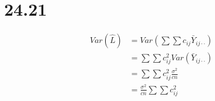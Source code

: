\documentclass{article}\usepackage[]{graphicx}\usepackage[]{color}
\begin{document}
\section{24.21}

\begin{displaymath}
\begin{split}
Var(\hat{L}) &= Var(\sum\sum c_{ij}\bar{Y}_{ij\cdot\cdot}) \\
             &= \sum\sum c_{ij}^2 Var(\bar{Y}_{ij\cdot\cdot}) \\
             &= \sum\sum c_{ij}^2 \frac{\sigma^2}{cn} \\
             &= \frac{\sigma^2}{cn} \sum\sum c_{ij}^2
\end{split}
\end{displaymath} 
\end{document}
